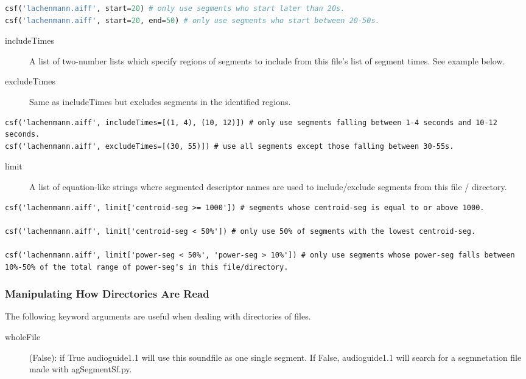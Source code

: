 \documentclass{article}
\newcommand{\ag}{audioguide1.1 }
\begin{document}
\begin{spacing}{1.2}
\begin{lstlisting}[language=python]
csf('lachenmann.aiff', start=20) # only use segments who start later than 20s.
csf('lachenmann.aiff', start=20, end=50) # only use segments who start between 20-50s.
\end{lstlisting}

\begin{description}
\item[includeTimes] A list of two-number lists which specify regions of segments to include from this file's list of segment times.  See example below.
\item[excludeTimes] Same as includeTimes but excludes segments in the identified regions.
\end{description}

\begin{lstlisting}
csf('lachenmann.aiff', includeTimes=[(1, 4), (10, 12)]) # only use segments falling between 1-4 seconds and 10-12 seconds.
csf('lachenmann.aiff', excludeTimes=[(30, 55)]) # use all segments except those falling between 30-55s.
\end{lstlisting}

\begin{description}
\item[limit] A list of equation-like strings where segmented descriptor names are used to include/exclude segments from this file / directory.
\end{description}
\begin{lstlisting}
csf('lachenmann.aiff', limit['centroid-seg >= 1000']) # segments whose centroid-seg is equal to or above 1000.

csf('lachenmann.aiff', limit['centroid-seg < 50%']) # only use 50% of segments with the lowest centroid-seg.

csf('lachenmann.aiff', limit['power-seg < 50%', 'power-seg > 10%']) # only use segments whose power-seg falls between 10%-50% of the total range of power-seg's in this file/directory.
\end{lstlisting}



\subsubsection{Manipulating How Directories Are Read}
The following keyword arguments are useful when dealing with directories of files.
\begin{description}
\item[wholeFile] (False): if True \ag will use this soundfile as one single segment.  If False, \ag will search for a segmnetation file made with agSegmentSf.py.


\end{description}
\end{spacing}
\end{document}
